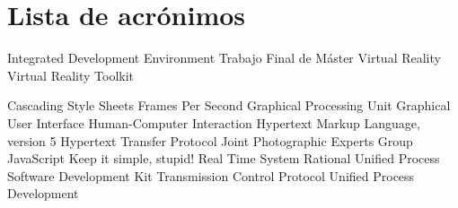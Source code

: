 \chapter{Lista de acrónimos}
{
\small
\begin{acronym}[XXXXXXXX]

     {Integrated Development Environment}
     {Trabajo Final de Máster}
      {Virtual Reality}
    {Virtual Reality Toolkit}

     {Cascading Style Sheets}
     {Frames Per Second}
     {Graphical Processing Unit}
     {Graphical User Interface}  
     {Human-Computer Interaction}
   {Hypertext Markup Language, version 5}
    {Hypertext Transfer Protocol}  
    {Joint Photographic Experts Group}
      {JavaScript}
    {Keep it simple, stupid!} 
     {Real Time System}
     {Rational Unified Process}
     {Software Development Kit}
     {Transmission Control Protocol}  
     {Unified Process Development}

\end{acronym}
}




